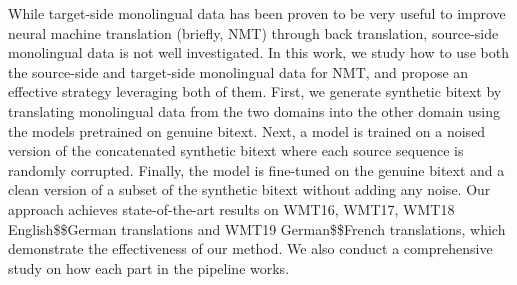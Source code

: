 While target-side monolingual data has been proven to be very useful to improve neural machine translation (briefly, NMT) through back translation, source-side monolingual data is not well investigated. In this work, we study how to use both the source-side and target-side monolingual data for NMT, and propose an effective strategy leveraging both of them. First, we generate synthetic bitext by translating monolingual data from the two domains into the other domain using the models pretrained on genuine bitext. Next, a model is trained on a noised version of the concatenated synthetic bitext where each source sequence is randomly corrupted. Finally, the model is fine-tuned on the genuine bitext and a clean version of a subset of the synthetic bitext without adding any noise. Our approach achieves state-of-the-art results on WMT16, WMT17, WMT18 English\$\leftrightarrow\$German translations and WMT19 German\$\to\$French translations, which demonstrate the effectiveness of our method. We also conduct a comprehensive study on how each part in the pipeline works.